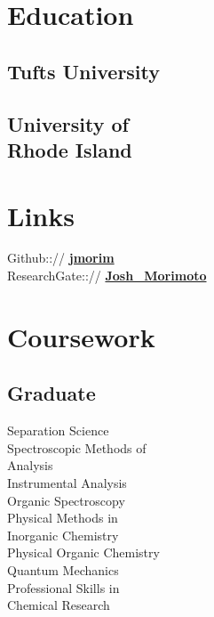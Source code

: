\documentclass[]{deedy-resume-openfont}
\begin{document}
\lastupdated


%
%
\begin{minipage}[t]{0.23\textwidth}

\section{Education}

\subsection{Tufts University}
\sectionsep

\subsection[University of Rhode Island]{University of\\ Rhode Island}
\sectionsep

\section{Links}
Github::// \href{https://github.com/jmorim}{\bf jmorim}\\
ResearchGate::// \href{https://researchgate.net/profile/Josh_Morimoto}{\bf
Josh\_Morimoto}
\sectionsep

\section{Coursework}
\subsection{Graduate}
Separation Science \\
Spectroscopic Methods of \\
\hspace*{2mm}Analysis \\
Instrumental Analysis \\
Organic Spectroscopy \\
Physical Methods in \\
\hspace*{2mm}Inorganic Chemistry \\
Physical Organic Chemistry \\
Quantum Mechanics \\
Professional Skills in\\
\hspace*{2mm}Chemical Research \\
\sectionsep


\end{minipage}
\end{document}
